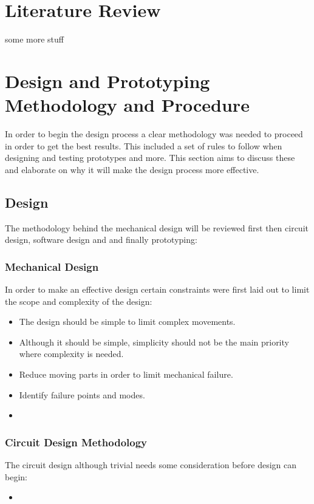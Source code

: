 \documentclass[a4paper,11pt]{article}
\begin{document}
\section{Literature Review}
	some more stuff
	\newpage
	
\section{Design and Prototyping Methodology and Procedure}
	In order to begin the design process a clear methodology was needed to proceed in order to get the best results. This included a set of rules to follow when designing and testing prototypes and more. This section aims to discuss these and elaborate on why it will make the design process more effective. 

\subsection{Design}
The methodology behind the mechanical design will be reviewed first then circuit design, software design and and finally prototyping:
\subsubsection{Mechanical Design}
In order to make an effective design certain constraints were first laid out to limit the scope and complexity of the design:
\begin{itemize}
	\item The design should be simple to limit complex movements.
	\item Although it should be simple, simplicity should not be the main priority where complexity is needed.
	\item Reduce moving parts in order to limit mechanical failure.
	\item Identify failure points and modes.
	\item 	 
\end{itemize}

\subsubsection{Circuit Design Methodology}
The circuit design although trivial needs some consideration before design can begin:
\begin{itemize}
	\item 	 
\end{itemize}
\end{document}
